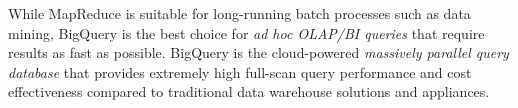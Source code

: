 \documentclass[twocolumn]{article}
\begin{document}
While MapReduce is suitable for long-running batch processes such as data mining, BigQuery is the best choice for \textit{ad hoc OLAP/BI queries} that require results as fast as possible. BigQuery is the cloud-powered \textit{massively parallel query database} that provides extremely high full-scan query performance and cost effectiveness compared to traditional data warehouse solutions and appliances.



\end{document}
